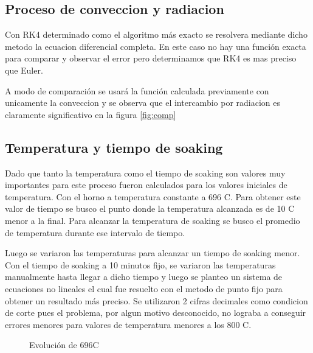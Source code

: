 \documentclass[11pt,a4paper]{article}
\begin{document}
\subsection{Proceso de conveccion y radiacion}

Con RK4 determinado como el algoritmo más exacto se resolvera mediante dicho metodo la ecuacion diferencial completa. En este caso no hay una función exacta para comparar y observar el error pero determinamos que RK4 es mas preciso que Euler.

A modo de comparación se usará la función calculada previamente con unicamente la conveccion y se observa que el intercambio por radiacion es claramente significativo en la figura \ref{fig:comp}

\subsection{Temperatura y tiempo de soaking}

Dado que tanto la temperatura como el tiempo de soaking son valores muy importantes para este proceso fueron calculados para los valores iniciales de temperatura. Con el horno a temperatura constante a 696 \degree C. Para obtener este valor de tiempo se busco el punto donde la temperatura alcanzada es de 10 \degree C menor a la final. Para alcanzar la temperatura de soaking se busco el promedio de temperatura durante ese intervalo de tiempo.

Luego se variaron las temperaturas para alcanzar un tiempo de soaking menor. Con el tiempo de soaking a 10 minutos fijo, se variaron las temperaturas manualmente hasta llegar a dicho tiempo y luego se planteo un sistema de ecuaciones no lineales el cual fue resuelto con el metodo de punto fijo para obtener un resultado más preciso. Se utilizaron 2 cifras decimales como condicion de corte pues el problema, por algun motivo desconocido, no lograba a conseguir errores menores para valores de temperatura menores a los 800  \degree C.

\begin{figure}[H]
	\caption{Evolución de 696\degree C}
    \label{fig:A}
\end{figure}
\end{document}
